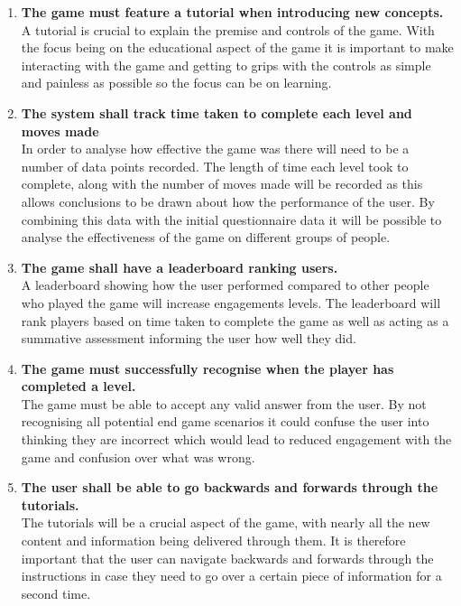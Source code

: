 \documentclass[12pt,a4paper]{report}
\begin{document}
\begin{enumerate}[label*=\arabic*]
 \item \textbf{The game must feature a tutorial when introducing new concepts.}\\
A tutorial is crucial to explain the premise and controls of the game. With the focus being on the educational aspect of the game it is important to make interacting with the game and getting to grips with the controls as simple and painless as possible so the focus can be on learning.

            	  \item \textbf{The system shall track time taken to complete each level and moves made}\\
In order to analyse how effective the game was there will need to be a number of data points recorded. The length of time each level took to complete, along with the number of moves made will be recorded as this allows conclusions to be drawn about how the performance of the user. By combining this data with the initial questionnaire data it will be possible to analyse the effectiveness of the game on different groups of people.
            
	 
	  \item \textbf{The game shall have a leaderboard ranking users.}\\
A leaderboard showing how the user performed compared to other people who played the game will increase engagements levels. The leaderboard will rank players based on time taken to complete the game as well as acting as a summative assessment informing the user how well they did. 



 \item \textbf{The game must successfully recognise when the player has completed a level.}\\
The game must be able to accept any valid answer from the user. By not recognising all potential end game scenarios it could confuse the user into thinking they are incorrect which would lead to reduced engagement with the game and confusion over what was wrong.	 	

	  \item \textbf{The user shall be able to go backwards and forwards through the tutorials.}\\
The tutorials will be a crucial aspect of the game, with nearly all the new content and information being delivered through them. It is therefore important that the user can navigate backwards and forwards through the instructions in case they need to go over a certain piece of information for a second time.
            


\end{enumerate}
\end{document}
